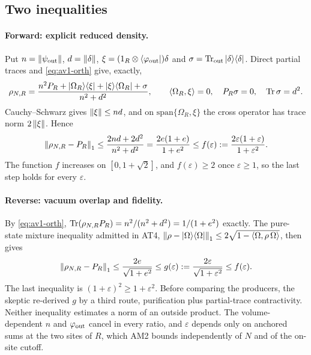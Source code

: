 \subsection{Two inequalities}
\label{sec:av1-inequalities}
\paragraph{Forward: explicit reduced density.}
Put $n=\left\lVert\psi_{\rm out}\right\rVert$, $d=\left\lVert\delta\right\rVert$,
$\xi=(1_R\otimes\langle\varphi_{\rm out}|)\delta$ and
$\sigma=\operatorname{Tr}_{\rm out}|\delta\rangle\langle\delta|$. Direct partial traces and
\eqref{eq:av1-orth} give, exactly,
\begin{equation}
 \rho_{N,R}=\frac{n^2P_R+|\Omega_R\rangle\langle\xi|+|\xi\rangle\langle\Omega_R|+\sigma}{n^2+d^2},
 \qquad \langle\Omega_R,\xi\rangle=0,\quad P_R\sigma=0,\quad \operatorname{Tr}\sigma=d^2 .
 \label{eq:av1-density}
\end{equation}
Cauchy--Schwarz gives $\left\lVert\xi\right\rVert\le nd$, and on $\mathrm{span}\{\Omega_R,\xi\}$
the cross operator has trace norm $2\left\lVert\xi\right\rVert$. Hence
\begin{equation}
 \left\lVert\rho_{N,R}-P_R\right\rVert_1\le\frac{2nd+2d^2}{n^2+d^2}=\frac{2e(1+e)}{1+e^2}
 \le f(\varepsilon):=\frac{2\varepsilon(1+\varepsilon)}{1+\varepsilon^2}.
 \label{eq:av1-forward}
\end{equation}
The function $f$ increases on $[0,1+\sqrt2]$, and $f(\varepsilon)\ge2$ once
$\varepsilon\ge1$, so the last step holds for every $\varepsilon$.

\paragraph{Reverse: vacuum overlap and fidelity.}
By \eqref{eq:av1-orth}, $\operatorname{Tr}(\rho_{N,R}P_R)=n^2/(n^2+d^2)=1/(1+e^2)$ exactly.
The pure-state mixture inequality admitted in AT4,
$\left\lVert\rho-|\Omega\rangle\langle\Omega|\right\rVert_1\le2\sqrt{1-\langle\Omega,\rho\,\Omega\rangle}$,
then gives
\begin{equation}
 \left\lVert\rho_{N,R}-P_R\right\rVert_1\le\frac{2e}{\sqrt{1+e^2}}
 \le g(\varepsilon):=\frac{2\varepsilon}{\sqrt{1+\varepsilon^2}}\le f(\varepsilon).
 \label{eq:av1-reverse}
\end{equation}
The last inequality is $(1+\varepsilon)^2\ge1+\varepsilon^2$. Before comparing
the producers, the skeptic re-derived $g$ by a third route, purification plus
partial-trace contractivity. Neither inequality estimates a norm of an outside
product. The volume-dependent $n$ and $\varphi_{\rm out}$ cancel in every
ratio, and $\varepsilon$ depends only on anchored sums at the two sites of
$R$, which AM2 bounds independently of $N$ and of the on-site cutoff.


